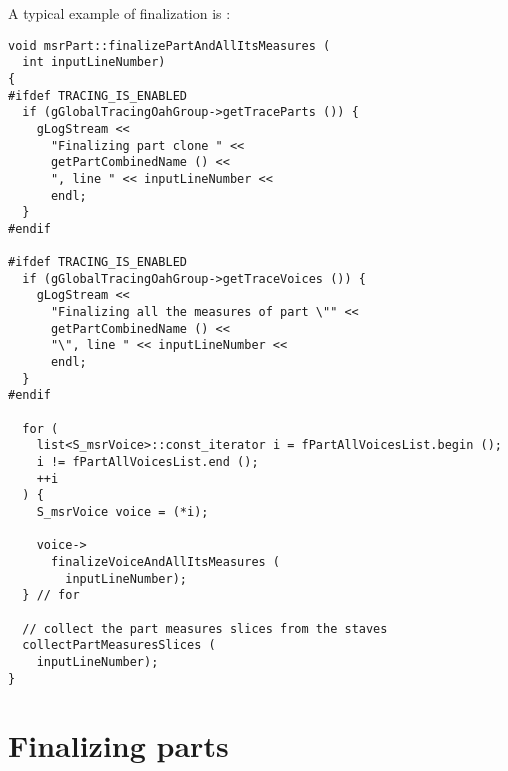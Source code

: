A typical example of \cascading finalization is :
\begin{lstlisting}[language=CPlusPlus]
void msrPart::finalizePartAndAllItsMeasures (
  int inputLineNumber)
{
#ifdef TRACING_IS_ENABLED
  if (gGlobalTracingOahGroup->getTraceParts ()) {
    gLogStream <<
      "Finalizing part clone " <<
      getPartCombinedName () <<
      ", line " << inputLineNumber <<
      endl;
  }
#endif

#ifdef TRACING_IS_ENABLED
  if (gGlobalTracingOahGroup->getTraceVoices ()) {
    gLogStream <<
      "Finalizing all the measures of part \"" <<
      getPartCombinedName () <<
      "\", line " << inputLineNumber <<
      endl;
  }
#endif

  for (
    list<S_msrVoice>::const_iterator i = fPartAllVoicesList.begin ();
    i != fPartAllVoicesList.end ();
    ++i
  ) {
    S_msrVoice voice = (*i);

    voice->
      finalizeVoiceAndAllItsMeasures (
        inputLineNumber);
  } // for

  // collect the part measures slices from the staves
  collectPartMeasuresSlices (
    inputLineNumber);
}
\end{lstlisting}


\section{Finalizing parts}

